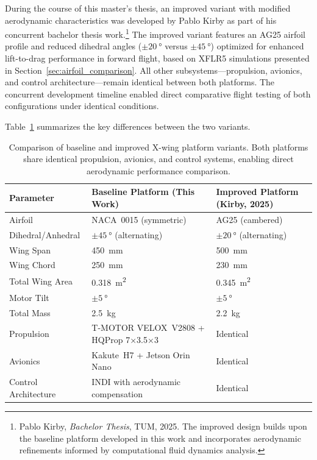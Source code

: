 During the course of this master's thesis, an improved variant with modified aerodynamic characteristics was developed by Pablo Kirby as part of his concurrent bachelor thesis work.\footnote{Pablo Kirby, \textit{Bachelor Thesis}, TUM, 2025. The improved design builds upon the baseline platform developed in this work and incorporates aerodynamic refinements informed by computational fluid dynamics analysis.} The improved variant features an AG25 airfoil profile and reduced dihedral angles ($\pm\SI{20}{\degree}$ versus $\pm\SI{45}{\degree}$) optimized for enhanced lift-to-drag performance in forward flight, based on XFLR5 simulations presented in Section~\ref{sec:airfoil_comparison}. All other subsystems—propulsion, avionics, and control architecture—remain identical between both platforms. The concurrent development timeline enabled direct comparative flight testing of both configurations under identical conditions.

Table~\ref{tab:platform_comparison} summarizes the key differences between the two variants.

\begin{table}[h]
\centering
\caption{Comparison of baseline and improved X-wing platform variants. Both platforms share identical propulsion, avionics, and control systems, enabling direct aerodynamic performance comparison.}
\label{tab:platform_comparison}
\small
\begin{tabularx}{\textwidth}{lXX}
\toprule
Parameter & Baseline Platform (This Work) & Improved Platform (Kirby, 2025) \\
\midrule
Airfoil & NACA~0015 (symmetric) & AG25 (cambered) \\
Dihedral/Anhedral & $\pm\SI{45}{\degree}$ (alternating) & $\pm\SI{20}{\degree}$ (alternating) \\
Wing Span & \SI{450}{\milli\meter} & \SI{500}{\milli\meter} \\
Wing Chord & \SI{250}{\milli\meter} & \SI{230}{\milli\meter} \\
Total Wing Area & \SI{0.318}{\meter\squared} & \SI{0.345}{\meter\squared} \\
Motor Tilt & $\pm\SI{5}{\degree}$ & $\pm\SI{5}{\degree}$ \\
Total Mass & \SI{2.5}{\kilogram} & \SI{2.2}{\kilogram} \\
Propulsion & T-MOTOR VELOX~V2808 + HQProp 7×3.5×3 & Identical \\
Avionics & Kakute~H7 + Jetson Orin Nano & Identical \\
Control Architecture & INDI with aerodynamic compensation & Identical \\
\bottomrule
\end{tabularx}
\end{table}

